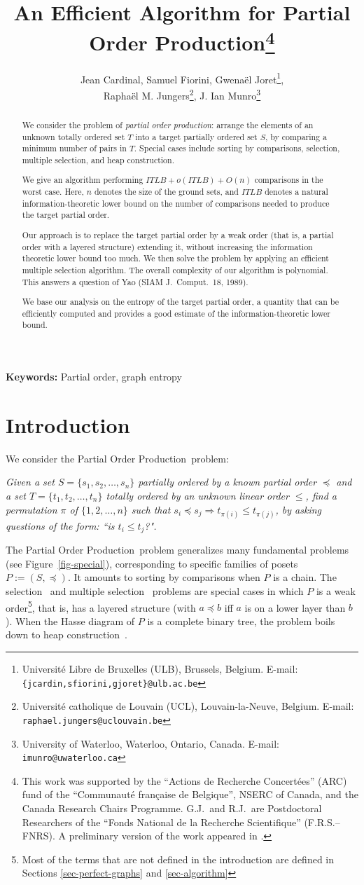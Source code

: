\documentclass[12pt,oneside]{article}
\author{Jean Cardinal, Samuel Fiorini, Gwena\"el Joret\thanks{Universit\'e Libre de Bruxelles (ULB), Brussels, Belgium. {E-mail: \tt\small \{jcardin,sfiorini,gjoret\}@ulb.ac.be}
},\\ Rapha\"el M. Jungers\thanks{Universit\'e catholique de Louvain (UCL), Louvain-la-Neuve, Belgium. {E-mail: \tt\small raphael.jungers@uclouvain.be}  }, J. Ian Munro\thanks{University of Waterloo, Waterloo, Ontario, Canada. {E-mail: \tt\small imunro@uwaterloo.ca}}
}
\title{An Efficient Algorithm for Partial Order Production\footnote{This work was supported by the ``Actions de Recherche Concert\'ees'' (ARC) fund of the ``Communaut\'e fran\c{c}aise de Belgique'', NSERC of Canada, and the Canada Research Chairs Programme. G.J.\ and R.J.\ are Postdoctoral Researchers of the ``Fonds National de la Recherche Scientifique'' (F.R.S.--FNRS). A preliminary version of the work appeared in \cite{CFJJM09-stoc}.}}
\date{}
\newcommand{\partsort}{{\sc Partial Order Production}}
\begin{document}
\maketitle

\begin{abstract} We consider the problem of {\em partial order production}: arrange the elements of an unknown totally ordered set $T$ into a target partially ordered set $S$, by comparing a minimum number of pairs in $T$. Special cases include sorting by comparisons, selection, multiple selection, and heap construction.

We give an algorithm performing $ITLB + o(ITLB) + O(n)$ comparisons in the worst case. Here, $n$ denotes the size of the ground sets, and $ITLB$ denotes a natural information-theoretic lower bound on the number of comparisons needed to produce the target partial order.

Our approach is to replace the target partial order by a weak order (that is, a partial order with a layered structure) extending it, without increasing the information theoretic lower bound too much. We then solve the problem by applying an efficient multiple selection algorithm. The overall complexity of our algorithm is polynomial. This answers a question of Yao (SIAM J.\ Comput.\ 18, 1989).

We base our analysis on the entropy of the target partial order, a quantity that can be efficiently computed and provides a good estimate of the information-theoretic lower bound.
\end{abstract}
\textbf{Keywords: }{Partial order, graph entropy}

\section{Introduction}

We consider the \partsort\ problem:\smallskip

{\it Given a set $S = \{ s_1, s_2,\ldots , s_n\}$ partially ordered by a known partial order $\preccurlyeq$ and a set $T = \{ t_1, t_2,\ldots , t_n\}$ totally ordered by an unknown linear order $\leqslant$, find a permutation $\pi$ of $\{1,2,\ldots ,n\}$ such that $s_i \preccurlyeq s_j \Rightarrow t_{\pi (i)} \leqslant t_{\pi(j)}$, by asking questions of the form: ``is $t_i \leqslant t_j$?".}\smallskip

The \partsort\ problem generalizes many fundamental problems (see Figure~\ref{fig-special}), corresponding to specific families of posets $P := (S,\preccurlyeq )$. It amounts to sorting by comparisons when $P$ is a chain. The selection~\cite{H61} and multiple selection~\cite{C71} problems are special cases in which $P$ is a weak order\footnote{Most of the terms that are not defined in the introduction are defined in Sections \ref{sec-perfect-graphs} and \ref{sec-algorithm}}, that is, has a layered structure (with $a \preccurlyeq b$ iff $a$ is on a lower layer than $b$). When the Hasse diagram of $P$ is a complete binary tree, the problem boils down to heap construction~\cite{CC92}.
\end{document}

